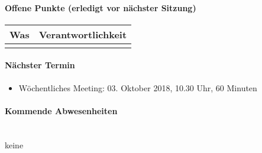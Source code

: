 \paragraph{Offene Punkte (erledigt vor nächster Sitzung)} \mbox{}
\begin{table}[H]
	\centering
	\begin{tabularx}{\textwidth}{X | p{4.5cm}}
		\rowcolor{gray!50}
		\textbf{Was} & \textbf{Verantwortlichkeit} \\
		\hline	
		&  \\
	\end{tabularx}
	\label{tab:my-label}
\end{table}

\paragraph{Nächster Termin}
\begin{itemize}	
	\item Wöchentliches Meeting: 03. Oktober 2018, 10.30 Uhr, 60 Minuten
\end{itemize}

\paragraph{Kommende Abwesenheiten} \mbox{}\\
keine